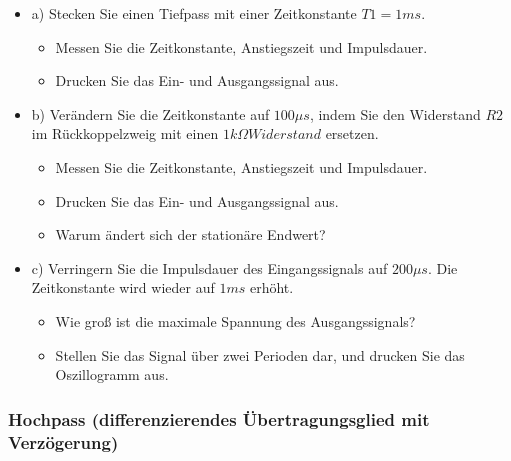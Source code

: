 \begin{itemize}
\item a) Stecken Sie einen Tiefpass mit einer Zeitkonstante $T1 = 1ms$. 
\begin{itemize}
	\item Messen Sie die Zeitkonstante, Anstiegszeit und Impulsdauer. 
	\item Drucken Sie das Ein- und Ausgangssignal aus.
\end{itemize}
\end{itemize} 
\begin{itemize}
	\item b) Verändern  Sie  die  Zeitkonstante auf  $100  \mu s$,  indem  Sie  den  Widerstand  $R2$ im Rückkoppelzweig 
			mit einen $1k \Omega Widerstand$ ersetzen. 
\begin{itemize}
	\item Messen Sie die Zeitkonstante, Anstiegszeit und Impulsdauer. 
	\item Drucken Sie das Ein- und Ausgangssignal aus. 
	\item Warum ändert sich der stationäre Endwert? 
\end{itemize}
\end{itemize}
\begin{itemize}
	\item c) Verringern  Sie  die  Impulsdauer  des  Eingangssignals  auf  $200 \mu s$.  Die  Zeitkonstante wird wieder auf $1 ms$ erhöht. 
\begin{itemize}
	\item Wie groß ist die maximale Spannung des Ausgangssignals? 
	\item Stellen Sie das Signal über zwei Perioden dar, und drucken Sie das Oszillogramm aus. 
\end{itemize}
\end{itemize}

\subsubsection{Hochpass (differenzierendes Übertragungsglied mit Verzögerung)}

